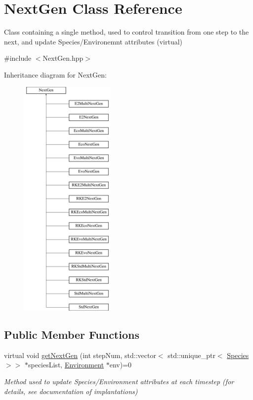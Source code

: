 \hypertarget{classNextGen}{}\section{Next\+Gen Class Reference}
\label{classNextGen}


Class containing a single method, used to control transition from one step to the next, and update Species/\+Environemnt attributes (virtual)  




{\ttfamily \#include $<$Next\+Gen.\+hpp$>$}

Inheritance diagram for Next\+Gen\+:\begin{figure}[H]
\begin{center}
\leavevmode
\includegraphics[height=12.000000cm]{classNextGen}
\end{center}
\end{figure}
\subsection*{Public Member Functions}
\begin{DoxyCompactItemize}
\item 
virtual void \hyperlink{classNextGen_aa70da77e0ac03da1bd5414c5e3fd70c0}{get\+Next\+Gen} (int step\+Num, std\+::vector$<$ std\+::unique\+\_\+ptr$<$ \hyperlink{classSpecies}{Species} $>$$>$ $\ast$species\+List, \hyperlink{classEnvironment}{Environment} $\ast$env)=0
\begin{DoxyCompactList}\small\item\em Method used to update Species/\+Environment attributes at each timestep (for details, see documentation of implantations) \end{DoxyCompactList}\end{DoxyCompactItemize}


